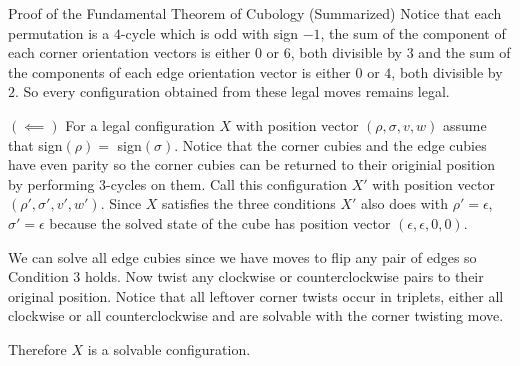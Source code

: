 \documentclass[final]{beamer}
\newlength{\colwidth}
\begin{document}
\begin{frame}[t]
\begin{columns}[t]
\begin{column}{\colwidth}
\begin{block}{Proof of the Fundamental Theorem of Cubology (Summarized)}
Notice that each permutation is a $4$-cycle which is odd with sign $-1$, the sum of the component of each corner orientation vectors is either $0$ or $6$, both divisible by $3$ and 
the sum of the components of each edge orientation vector is either $0$ or $4$, both divisible by $2$.
So every configuration obtained from these legal moves remains legal.

$(\impliedby)$ 
For a legal configuration $X$ with position vector $(\rho, \sigma, v, w)$ assume that sign$(\rho)=$ sign$(\sigma)$.
Notice that the corner cubies and the edge cubies have even parity so the corner cubies can be returned to their originial position by performing $3$-cycles on them. 
Call this configuration $X'$ with position vector $(\rho', \sigma', v', w')$.
Since $X$ satisfies the three conditions $X'$ also does with $\rho' = \epsilon$, $\sigma' = \epsilon$ because the solved state of the cube has position vector $(\epsilon, \epsilon, 0 , 0)$.

We can solve all edge cubies since we have moves to flip any pair of edges so Condition $3$ holds.
Now twist any clockwise or counterclockwise pairs to their original position.
Notice that all leftover corner twists occur in triplets, either all clockwise or all counterclockwise and are solvable with the corner twisting move.

Therefore $X$ is a solvable configuration.

  \end{block}





\end{column}
\end{columns}
\end{frame}
\end{document}
